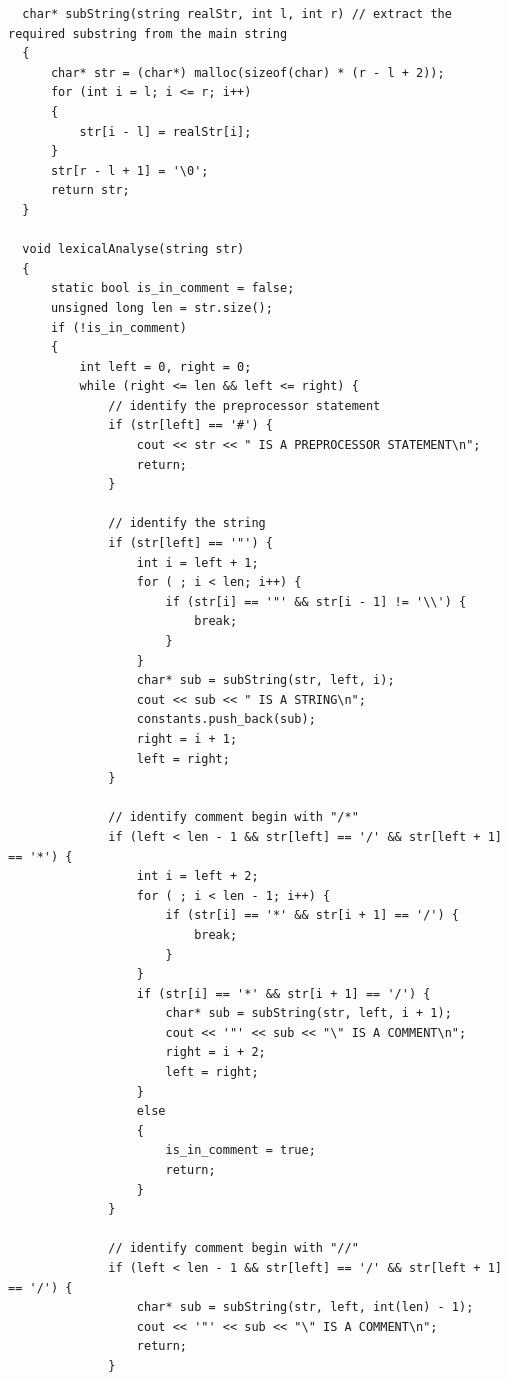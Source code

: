 \documentclass[11pt]{homework}
\begin{document}
\begin{lstlisting}
  char* subString(string realStr, int l, int r) // extract the required substring from the main string
  {
      char* str = (char*) malloc(sizeof(char) * (r - l + 2));
      for (int i = l; i <= r; i++)
      {
          str[i - l] = realStr[i];
      }
      str[r - l + 1] = '\0';
      return str;
  }
  
  void lexicalAnalyse(string str)
  {
      static bool is_in_comment = false;
      unsigned long len = str.size();
      if (!is_in_comment)
      {
          int left = 0, right = 0;
          while (right <= len && left <= right) {
              // identify the preprocessor statement
              if (str[left] == '#') {
                  cout << str << " IS A PREPROCESSOR STATEMENT\n";
                  return;
              }
              
              // identify the string
              if (str[left] == '"') {
                  int i = left + 1;
                  for ( ; i < len; i++) {
                      if (str[i] == '"' && str[i - 1] != '\\') {
                          break;
                      }
                  }
                  char* sub = subString(str, left, i);
                  cout << sub << " IS A STRING\n";
                  constants.push_back(sub);
                  right = i + 1;
                  left = right;
              }
              
              // identify comment begin with "/*"
              if (left < len - 1 && str[left] == '/' && str[left + 1] == '*') {
                  int i = left + 2;
                  for ( ; i < len - 1; i++) {
                      if (str[i] == '*' && str[i + 1] == '/') {
                          break;
                      }
                  }
                  if (str[i] == '*' && str[i + 1] == '/') {
                      char* sub = subString(str, left, i + 1);
                      cout << '"' << sub << "\" IS A COMMENT\n";
                      right = i + 2;
                      left = right;
                  }
                  else
                  {
                      is_in_comment = true;
                      return;
                  }
              }
              
              // identify comment begin with "//"
              if (left < len - 1 && str[left] == '/' && str[left + 1] == '/') {
                  char* sub = subString(str, left, int(len) - 1);
                  cout << '"' << sub << "\" IS A COMMENT\n";
                  return;
              }
              

\end{lstlisting}
\end{document}
